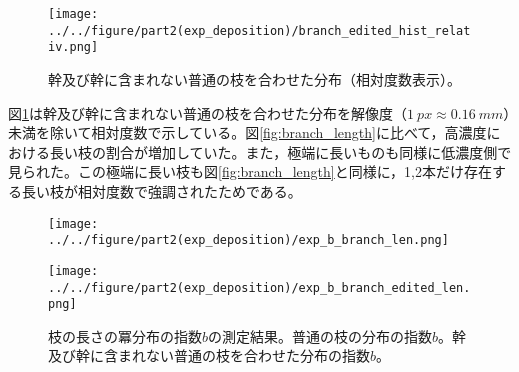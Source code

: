 \documentclass[autodetect-engine,dvi=dvipdfmx,a4paper,ja=standard,oneside,openany,11pt]{bxjsbook}
\begin{document}
\begin{figure}[htbp]
  \centering
  \texttt{[image: ../../figure/part2(exp\_deposition)/branch\_edited\_hist\_relativ.png]}
  \caption{幹及び幹に含まれない普通の枝を合わせた分布（相対度数表示）。}
  \label{fig:branch_length_edited}
\end{figure}

図\ref{fig:branch_length_edited}は幹及び幹に含まれない普通の枝を合わせた分布を解像度（$\SI{1}{px}\approx \SI{0.16}{mm}$）未満を除いて相対度数で示している。図\ref{fig:branch_length}に比べて，高濃度における長い枝の割合が増加していた。また，極端に長いものも同様に低濃度側で見られた。この極端に長い枝も図\ref{fig:branch_length}と同様に，1,2本だけ存在する長い枝が相対度数で強調されたためである。

\begin{figure}[htbp]
  \begin{minipage}
    {0.51\textwidth}
    \subcaption{}
    \centering
    \texttt{[image: ../../figure/part2(exp\_deposition)/exp\_b\_branch\_len.png]}
    \label{fig:exp_b_branch_len}
  \end{minipage}
  \begin{minipage}
    {0.49\textwidth}
    \subcaption{}
    \centering
    \texttt{[image: ../../figure/part2(exp\_deposition)/exp\_b\_branch\_edited\_len.png]}
    \label{fig:exp_b_branch_edited_len}
  \end{minipage}
  \caption{枝の長さの冪分布の指数$b$の測定結果。普通の枝の分布の指数$b$。幹及び幹に含まれない普通の枝を合わせた分布の指数$b$。}
  \label{fig:branch_length_exp}
\end{figure}
\end{document}
